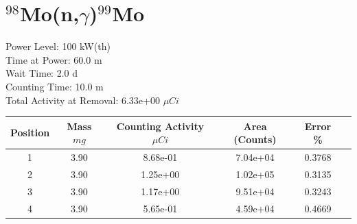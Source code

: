 \newpage

\section*{ $^{98}$Mo(n,$\gamma$)$^{99}$Mo }

Power Level: 100 kW(th) \\
Time at Power: 60.0 m \\
Wait Time:  2.0 d \\
Counting Time: 10.0 m \\
Total Activity at Removal: 6.33e+00 $\mu Ci$

\begin{table}[h]
\centering
\begin{tabular}{ |c|c|c|c|c|c| }
 \hline
 Position & Mass $mg$ & Counting Activity $\mu Ci$ & Area (Counts) & Error \% \\
 \hline 
 1 & 3.90 & 8.68e-01 & 7.04e+04 & 0.3768 \\ 
\hline
 2 & 3.90 & 1.25e+00 & 1.02e+05 & 0.3135 \\ 
\hline
 3 & 3.90 & 1.17e+00 & 9.51e+04 & 0.3243 \\ 
\hline
 4 & 3.90 & 5.65e-01 & 4.59e+04 & 0.4669 \\ 
\hline
\end{tabular}
\end{table}

